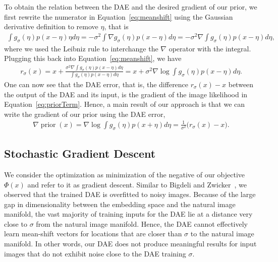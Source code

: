 \documentclass{article}
\DeclareMathOperator*{\prior}{prior}
\begin{document}
To obtain the relation between the DAE and the desired gradient of our prior, we first rewrite the numerator in Equation~\eqref{eq:meanshift} using the Gaussian derivative definition to remove $\eta$, that is
\begin{align}
\int g_{\sigma}(\eta) p(x- \eta) \eta d \eta = -\sigma^2 \int \nabla g_{\sigma}(\eta) p(x- \eta) d \eta 
 = -\sigma^2 \nabla \int g_{\sigma}(\eta) p(x- \eta) d \eta, 
\end{align}
where we used the Leibniz rule to interchange the $\nabla$ operator with the integral. Plugging this back into Equation~\eqref{eq:meanshift}, we have
\begin{align}
r_{\sigma}(x) = x + \frac{\sigma^2 \nabla \int g_{\sigma}(\eta) p(x- \eta) d \eta}{\int g_{\sigma}(\eta) p(x- \eta) d \eta} 
= x + \sigma^2 \nabla \log{\int g_{\sigma}(\eta) p(x- \eta)  d \eta}.
\end{align}
One can now see that the DAE error, that is, the difference $r_{\sigma}(x) - x$ between the output of the DAE and its input, is the gradient of the image likelihood in Equation~\eqref{eq:priorTerm}. Hence, a main result of our approach is that we can write the gradient of our prior using the DAE error,
\begin{align}
\nabla \prior(x) = \nabla \log \int g_{\sigma}(\eta) p(x+\eta) d \eta = \frac{1}{\sigma^2} \bigg(r_{\sigma}(x) - x \bigg).
\end{align}


\subsection{Stochastic Gradient Descent}
\label{sec:optimization}

We consider the optimization as minimization of the negative of our objective $\Phi(x)$ and refer to it as gradient descent.
Similar to Bigdeli and Zwicker~\cite{bigdeli2017image}, we observed that the trained DAE is overfitted to noisy images. Because of the large gap in dimensionality between the embedding space and the natural image manifold, the vast majority of training inputs for the DAE lie at a distance very close to $\sigma$ from the natural image manifold. Hence, the DAE cannot effectively learn mean-shift vectors for locations that are closer than $\sigma$ to the natural image manifold. In other words, our DAE does not produce meaningful results for input images that do not exhibit noise close to the DAE training $\sigma$.
	
\end{document}
